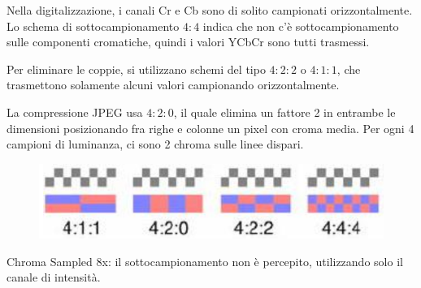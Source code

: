 Nella digitalizzazione, i canali Cr e Cb sono di solito campionati orizzontalmente. Lo schema di sottocampionamento $4 : 4$ indica che non c'è sottocampionamento sulle componenti cromatiche, quindi i valori YCbCr sono tutti trasmessi. 

Per eliminare le coppie, si utilizzano schemi del tipo $4 : 2 : 2$ o $4 : 1 : 1$, che trasmettono solamente alcuni valori campionando orizzontalmente. 

La compressione JPEG usa $4 : 2 : 0$, il quale elimina un fattore 2 in entrambe le dimensioni posizionando fra righe e colonne un pixel con croma media. Per ogni 4 campioni di luminanza, ci sono 2 chroma sulle linee dispari. 

\begin{figure}[h]
	\centering
	\includegraphics[scale=0.3]{Lezioni/Immagini/pixel}
\end{figure}

Chroma Sampled 8x: il sottocampionamento non è percepito, utilizzando solo il canale di intensità.
